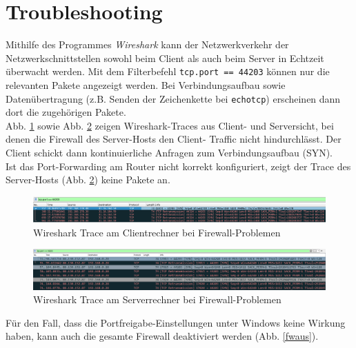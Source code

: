 \documentclass[11pt, a4paper]{article}
\newcommand{\code}[1]{{\lstinline{#1}}}
\begin{document}
\section{Troubleshooting}
Mithilfe des Programmes \textit{Wireshark} kann der Netzwerkverkehr
der Netzwerkschnittstellen sowohl beim Client als auch beim Server in Echtzeit
überwacht werden. Mit dem Filterbefehl \code{tcp.port == 44203} können nur die
relevanten Pakete angezeigt werden. Bei Verbindungsaufbau sowie Datenübertragung
(z.B. Senden der Zeichenkette bei \code{echotcp}) erscheinen dann dort die
zugehörigen Pakete.\\

Abb. \ref{fwdoof} sowie Abb. \ref{fwdoof2} zeigen Wireshark-Traces aus
Client- und Serversicht, bei denen die Firewall des Server-Hosts den Client-
Traffic nicht hindurchlässt. Der Client schickt dann kontinuierliche Anfragen
zum Verbindungsaufbau (SYN).\\

Ist das Port-Forwarding am Router nicht korrekt konfiguriert, zeigt der Trace
des Server-Hosts (Abb. \ref{fwdoof2}) keine Pakete an.

\begin{figure}[H]
\centering
\includegraphics[width=\textwidth]{graphics/firewall_doof}
\caption{Wireshark Trace am Clientrechner bei Firewall-Problemen}\label{fwdoof}
\end{figure}

\begin{figure}[H]
\centering
\includegraphics[width=\textwidth]{graphics/firewall_doof_srv}
\caption{Wireshark Trace am Serverrechner bei Firewall-Problemen}\label{fwdoof2}
\end{figure}

Für den Fall, dass die Portfreigabe-Einstellungen unter Windows keine Wirkung haben,
kann auch die gesamte Firewall deaktiviert werden (Abb. \ref{fwaus}).
\end{document}
